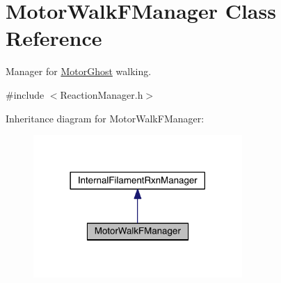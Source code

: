 \hypertarget{classMotorWalkFManager}{\section{Motor\+Walk\+F\+Manager Class Reference}
\label{classMotorWalkFManager}
}


Manager for \hyperlink{classMotorGhost}{Motor\+Ghost} walking.  




{\ttfamily \#include $<$Reaction\+Manager.\+h$>$}



Inheritance diagram for Motor\+Walk\+F\+Manager\+:\nopagebreak
\begin{figure}[H]
\begin{center}
\leavevmode
\includegraphics[width=225pt]{classMotorWalkFManager__inherit__graph}
\end{center}
\end{figure}


